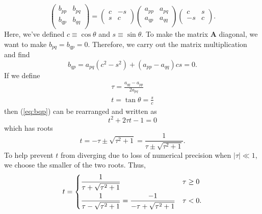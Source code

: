 \documentclass[aps,prc,reprint,nobalancelastpage]{revtex4-1}
\begin{document}
        \begin{equation*}
            \begin{pmatrix}
                b_{pp} & b_{pq} \\
                b_{qp} & b_{qq} \\
            \end{pmatrix}
            =
            \begin{pmatrix}
                c & -s \\
                s & c \\
            \end{pmatrix}
            \begin{pmatrix}
                a_{pp} & a_{pq} \\
                a_{qp} & a_{qq} \\
            \end{pmatrix}
            \begin{pmatrix}
                c & s \\
                -s & c \\
            \end{pmatrix}.
        \end{equation*}
        Here, we've defined $c\equiv\cos\theta$ and $s\equiv\sin\theta$. To make the matrix $\mathbf{A}$ diagonal, we want to make $b_{pq} = b_{qp} = 0$. Therefore, we carry out the matrix multiplication and find
        \begin{equation}
            b_{qp} = a_{pq}(c^2-s^2) + (a_{pp} - a_{qq}) cs = 0.  \label{eq:bqp}
        \end{equation}
        If we define
        \begin{gather}
            \tau = \frac{a_{qq} - a_{pp}}{2a_{pq}}  \label{eq:tau} \\
            t = \tan\theta = \frac{s}{c}
        \end{gather}
        then (\ref{eq:bqp}) can be rearranged and written as
        \begin{equation*}
            t^2 + 2\tau t - 1 = 0
        \end{equation*}
        which has roots
        \begin{equation}
            t = -\tau \pm \sqrt{\tau^2 + 1} = \frac{1}{\tau \pm \sqrt{\tau^2 + 1}}.
        \end{equation}
        To help prevent $t$ from diverging due to loss of numerical precision when $|\tau| \ll 1$, we choose the smaller of the two roots. Thus,
        \begin{equation}
            t = \begin{dcases}
                \frac{1}{\tau + \sqrt{\tau^2 + 1}} & \tau \geq 0 \\
                \frac{1}{\tau - \sqrt{\tau^2 + 1}} = \frac{-1}{-\tau + \sqrt{\tau^2 + 1}} & \tau < 0. \\
            \end{dcases}
            \label{eq:t}
        \end{equation}
\end{document}
